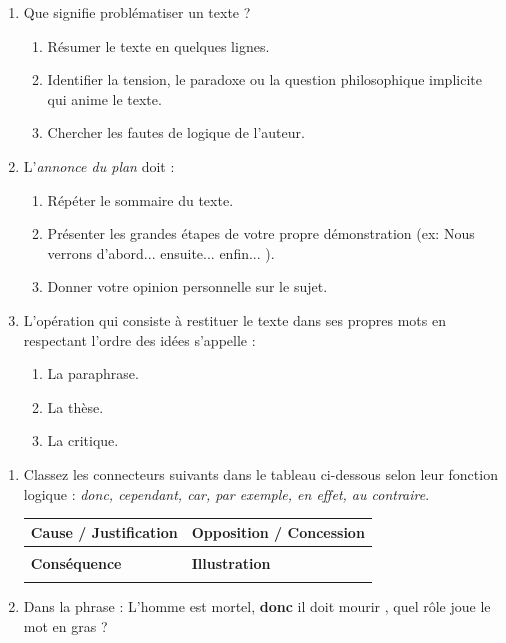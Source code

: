 \documentclass[11pt]{article}
\begin{document}
\begin{exercice}
\begin{enumerate}
    \item Que signifie \og problématiser \fg{} un texte ?
    \begin{enumerate}
        \item Résumer le texte en quelques lignes.
        \item Identifier la tension, le paradoxe ou la question philosophique implicite qui anime le texte.
        \item Chercher les fautes de logique de l'auteur.
    \end{enumerate}
    \item L'\textit{annonce du plan} doit :
    \begin{enumerate}
        \item Répéter le sommaire du texte.
        \item Présenter les grandes étapes de votre propre démonstration (ex: \og Nous verrons d'abord... ensuite... enfin... \fg{}).
        \item Donner votre opinion personnelle sur le sujet.
    \end{enumerate}
    \item L'opération qui consiste à \og restituer le texte dans ses propres mots \fg{} en respectant l'ordre des idées s'appelle :
    \begin{enumerate}
        \item La paraphrase.
        \item La thèse.
        \item La critique.
    \end{enumerate}
\end{enumerate}
\end{exercice}

\begin{exercice}
\begin{enumerate}
    \item Classez les connecteurs suivants dans le tableau ci-dessous selon leur fonction logique : \textit{donc, cependant, car, par exemple, en effet, au contraire}.
    \begin{center}
    \begin{tabular}{|l|l|}
    \hline
    \textbf{Cause / Justification} & \textbf{Opposition / Concession} \\ \hline
    & \\ \hline
    \textbf{Conséquence} & \textbf{Illustration} \\ \hline
    & \\ \hline
    \end{tabular}
    \end{center}
    \item Dans la phrase : \og L'homme est mortel, \textbf{donc} il doit mourir \fg{}, quel rôle joue le mot en gras ?
\end{enumerate}
\end{exercice}
\end{document}
